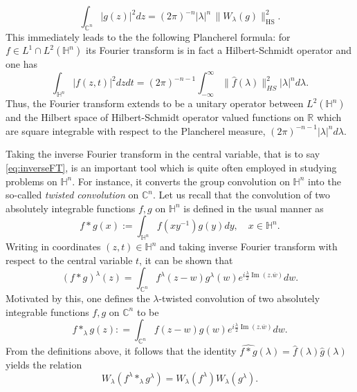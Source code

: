 \documentclass[11pt, reqno]{amsart}
\theoremstyle{plain}
\newcommand{\R}{\ensuremath{\mathbb{R_+}}}
\theoremstyle{remark}
\theoremstyle{example}
\theoremstyle{definition}
\numberwithin{equation}{section}
\def\R{\mathbb{R}}
\def\H{\mathbb{H}}
\def\Ha{\mathbb{H}^n}
\def\C{\mathbb{C}}
\newcommand{\Ca}{\mathbb{C}^n}
\newcommand{\im}{\mathop{\mathrm{Im}}}
\begin{document}
\begin{equation}\label{Plancherel Weyl}
    \int_{\Ca} |g(z)|^2 dz = (2\pi)^{-n} |\lambda|^n \,  \| W_{\lambda}(g) \|_{\text{HS}}^2.
\end{equation}
This immediately leads to the the following Plancherel formula:
for $ f \in L^1 \cap L^2(\Ha) $ its Fourier transform  is in fact a Hilbert-Schmidt operator and one has 
\begin{equation}\label{Plancherel}
    \int_{\Ha} |f(z,t)|^2 dz dt = (2\pi)^{-n-1} \int_{-\infty}^\infty \|\hat{f}(\lambda)\|_{HS}^2 |\lambda|^n d\lambda .
\end{equation}
Thus,  the Fourier transform extends to be  a unitary operator between $ L^2(\Ha) $ and the Hilbert space of Hilbert-Schmidt operator valued functions  on $ \R $ which are square integrable with respect to the Plancherel measure, $ (2\pi)^{-n-1} |\lambda|^n d\lambda.$





Taking the inverse Fourier transform in the central variable, that is to say \eqref{eq:inverseFT}, is an important tool which is quite often employed in studying problems on $ \H^n$. For instance, it converts the group convolution on $ \H^n $ into the so-called \emph{twisted convolution} on $ \C^n$. Let us recall that the convolution of two absolutely integrable functions $ f,g $ on $\H^n$ is defined in the usual manner as
$$
f*g(x) := \int_{\H^n} f(xy^{-1})g(y) dy, \quad x\in \H^n.
$$
Writing in coordinates $(z,t) \in \Ha$ and taking inverse Fourier transform with respect to  the central variable $t$, it can be shown that
$$
(f*g)^\lambda  (z) = \int_{\C^n} f^\lambda(z-w)g^\lambda(w) e^{ i \frac{\lambda}{2} \im(z . \overline{w})} dw.
$$
Motivated by this, one defines the $\lambda$-twisted convolution of two absolutely integrable functions $f,g$ on $ \Ca$  to be
\begin{equation*}
  f \ast_{\lambda} g   (z) : = \int_{\C^n} f(z-w) g(w) e^{ i \frac{\lambda}{2} \im(z . \overline{w})} dw.
\end{equation*}
From the definitions above, it follows that the identity $ \widehat{f*g}(\lambda) = \widehat{f}(\lambda) \widehat{g}(\lambda)$ yields the relation 
\begin{equation} \label{Weyl on twisted convolution}
     W_\lambda(f^\lambda*_\lambda g^\lambda)
=W_\lambda(f^\lambda)W_\lambda(g^\lambda).
\end{equation}
\end{document}

